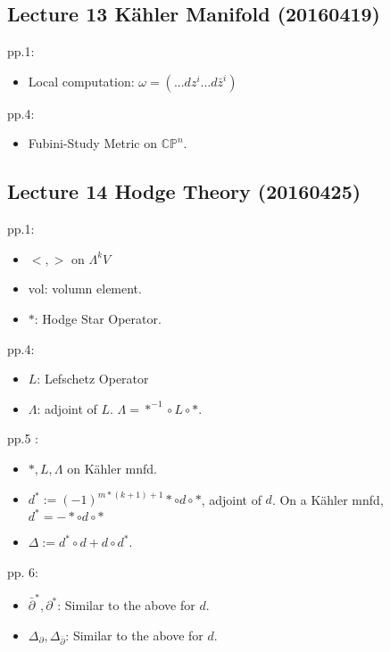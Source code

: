 \documentclass{article}
\numberwithin{equation}{subsection} %
\begin{document}
	\subsection{Lecture 13 Kähler Manifold (20160419)}
	pp.1:
	\begin{itemize}
		\item Local computation: $\omega = (...dz^i...d\bar{z}^i)$
	\end{itemize}
	pp.4:
	\begin{itemize}
		\item Fubini-Study Metric on $\mathbb{CP}^n$.
	\end{itemize}
	
	\subsection{Lecture 14 Hodge Theory (20160425)}
	pp.1:
	\begin{itemize}
		\item $<,>$ on $\Lambda^k V$
		\item vol: volumn element.
		\item $*$: Hodge Star Operator.
	\end{itemize}
	pp.4:
	\begin{itemize}
		\item $L$: Lefschetz Operator
		\item $\Lambda$: adjoint of $L$. $\Lambda = *^{-1}\circ L\circ *$.
	\end{itemize}
	pp.5 :
	\begin{itemize}
		\item $*,L,\Lambda$ on Kähler mnfd.
		\item $d^*:= (-1)^{m*(k+1)+1}*\circ d\circ*$, adjoint of $d$. On a Kähler mnfd, $d^*= -*\circ d\circ*$
		\item $\Delta:=d^*\circ d + d\circ d^*$.
	\end{itemize}
	pp. 6:
	\begin{itemize}
		\item $\bar{\partial}^*, \partial^*$: Similar to the above for $d$.
		\item $\Delta_\partial, \Delta_{\bar{\partial}}$: Similar to the above for $d$.
	\end{itemize}
	
\end{document}
